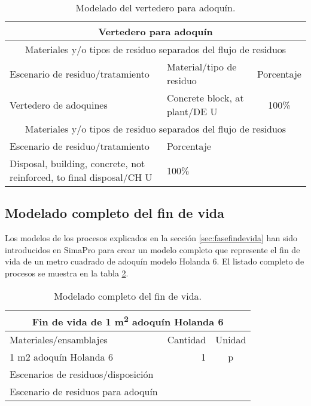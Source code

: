 \begin{table}[!htb]
\centering
\begin{tabular}{p{8cm}p{2cm}c}
\toprule
\multicolumn{3}{c}{Vertedero para adoquín}\\
\midrule
\multicolumn{3}{c}{Materiales y/o tipos de residuo separados del flujo de residuos}\\
\midrule
Escenario de residuo/tratamiento & Material/tipo de residuo & Porcentaje\\
\midrule
Vertedero de adoquines & Concrete block, at plant/DE U & 100\%\\
\midrule
\multicolumn{3}{c}{Materiales y/o tipos de residuo separados del flujo de residuos}\\
\midrule
Escenario de residuo/tratamiento & Porcentaje & \\
\midrule
Disposal, building, concrete, not reinforced, to final disposal/CH U & 100\% & \\
\bottomrule
\end{tabular}
\caption{Modelado del vertedero para adoquín.}
\label{modeladovertederoadoquin}
\end{table}

\subsection{Modelado completo del fin de vida}

Los modelos de los procesos explicados en la sección \ref{sec:fasefindevida} han sido introducidos en SimaPro para crear un modelo completo que represente el fin de vida de un metro cuadrado de adoquín modelo Holanda 6. El listado completo de procesos se muestra en la tabla \ref{modeladocompletofindevida}.

\begin{table}[!htb]
\centering
\begin{tabular}{p{8cm}rc}
\toprule
\multicolumn{3}{c}{Fin de vida de 1 \si{m^2} adoquín Holanda 6}\\
\midrule
Materiales/ensamblajes & Cantidad & Unidad\\
\midrule
1 m2 adoquín Holanda 6 & 1 & p\\
\midrule
Escenarios de residuos/disposición &  & \\
\midrule
Escenario de residuos para adoquín &  & \\
\bottomrule
\end{tabular}
\caption{Modelado completo del fin de vida.}
\label{modeladocompletofindevida}
\end{table}
